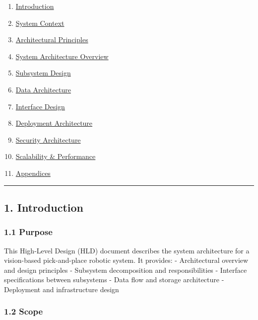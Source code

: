 \documentclass[
]{article}
\providecommand{\tightlist}{%
  \setlength{\itemsep}{0pt}\setlength{\parskip}{0pt}}
\begin{document}
\begin{enumerate}
\def\labelenumi{\arabic{enumi}.}
\tightlist
\item
  \protect\hyperlink{1-introduction}{Introduction}
\item
  \protect\hyperlink{2-system-context}{System Context}
\item
  \protect\hyperlink{3-architectural-principles}{Architectural
  Principles}
\item
  \protect\hyperlink{4-system-architecture-overview}{System Architecture
  Overview}
\item
  \protect\hyperlink{5-subsystem-design}{Subsystem Design}
\item
  \protect\hyperlink{6-data-architecture}{Data Architecture}
\item
  \protect\hyperlink{7-interface-design}{Interface Design}
\item
  \protect\hyperlink{8-deployment-architecture}{Deployment Architecture}
\item
  \protect\hyperlink{9-security-architecture}{Security Architecture}
\item
  \protect\hyperlink{10-scalability--performance}{Scalability \&
  Performance}
\item
  \protect\hyperlink{11-appendices}{Appendices}
\end{enumerate}

\begin{center}\rule{0.5\linewidth}{0.5pt}\end{center}

\hypertarget{introduction}{%
\subsection{1. Introduction}\label{introduction}}

\hypertarget{purpose}{%
\subsubsection{1.1 Purpose}\label{purpose}}

This High-Level Design (HLD) document describes the system architecture
for a vision-based pick-and-place robotic system. It provides: -
Architectural overview and design principles - Subsystem decomposition
and responsibilities - Interface specifications between subsystems -
Data flow and storage architecture - Deployment and infrastructure
design

\hypertarget{scope}{%
\subsubsection{1.2 Scope}\label{scope}}
\end{document}
